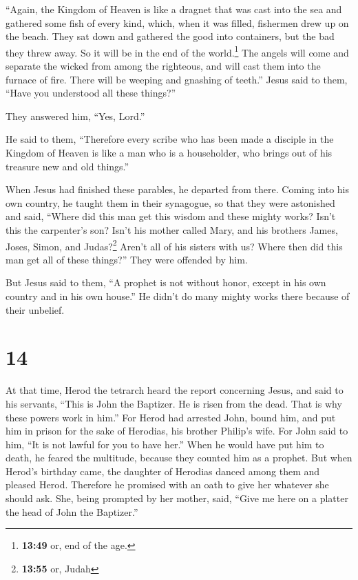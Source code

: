  ``Again, the Kingdom of Heaven is like a dragnet that
was cast into the sea and gathered some fish of every kind,
 which, when it was filled, fishermen drew up on the
beach. They sat down and gathered the good into containers, but the bad
they threw away.  So it will be in the end of the
world.\footnote{\textbf{13:49} or, end of the age.} The angels will come
and separate the wicked from among the righteous,  and
will cast them into the furnace of fire. There will be weeping and
gnashing of teeth.''  Jesus said to them, ``Have you
understood all these things?''

They answered him, ``Yes, Lord.''

 He said to them, ``Therefore every scribe who has been
made a disciple in the Kingdom of Heaven is like a man who is a
householder, who brings out of his treasure new and old things.''

 When Jesus had finished these parables, he departed from
there.  Coming into his own country, he taught them in
their synagogue, so that they were astonished and said, ``Where did this
man get this wisdom and these mighty works?  Isn't this
the carpenter's son? Isn't his mother called Mary, and his brothers
James, Joses, Simon, and Judas?\footnote{\textbf{13:55} or, Judah}
 Aren't all of his sisters with us? Where then did this
man get all of these things?''  They were offended by
him.

But Jesus said to them, ``A prophet is not without honor, except in his
own country and in his own house.''  He didn't do many
mighty works there because of their unbelief.

\hypertarget{section-13}{%
\section{14}\label{section-13}}

 At that time, Herod the tetrarch heard the report
concerning Jesus,  and said to his servants, ``This is
John the Baptizer. He is risen from the dead. That is why these powers
work in him.''  For Herod had arrested John, bound him,
and put him in prison for the sake of Herodias, his brother Philip's
wife.  For John said to him, ``It is not lawful for you to
have her.''  When he would have put him to death, he
feared the multitude, because they counted him as a prophet.
 But when Herod's birthday came, the daughter of Herodias
danced among them and pleased Herod.  Therefore he
promised with an oath to give her whatever she should ask.
 She, being prompted by her mother, said, ``Give me here
on a platter the head of John the Baptizer.''

